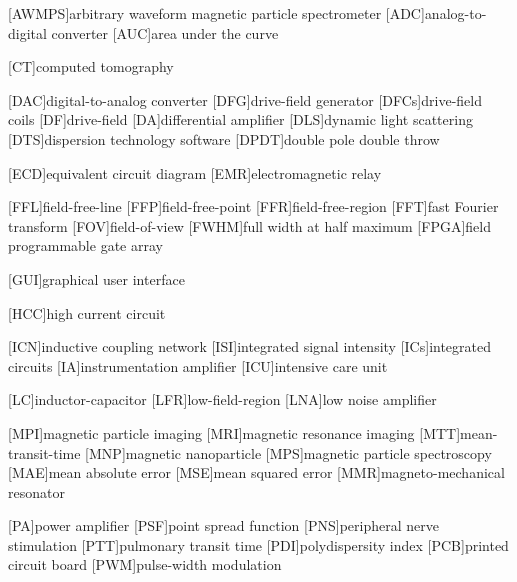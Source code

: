 \usepackage[nolist,nohyperlinks]{acronym}

% 
%
%

\begin{acronym}[ECU]

[AWMPS]{arbitrary waveform magnetic particle spectrometer}
[ADC]{analog-to-digital converter} 
[AUC]{area under the curve}

[CT]{computed tomography}

[DAC]{digital-to-analog converter}
[DFG]{drive-field generator}
[DFCs]{drive-field coils}
[DF]{drive-field}
[DA]{differential amplifier}
[DLS]{dynamic light scattering}
[DTS]{dispersion technology software}
[DPDT]{double pole double throw}

[ECD]{equivalent circuit diagram}
[EMR]{electromagnetic relay}

[FFL]{field-free-line}
[FFP]{field-free-point}
[FFR]{field-free-region}
[FFT]{fast Fourier transform}
[FOV]{field-of-view}
[FWHM]{full width at half maximum}
[FPGA]{field programmable gate array}


[GUI]{graphical user interface}

[HCC]{high current circuit}

[ICN]{inductive coupling network}
[ISI]{integrated signal intensity}
[ICs]{integrated circuits}
[IA]{instrumentation amplifier}
[ICU]{intensive care unit} 

[LC]{inductor-capacitor}
[LFR]{low-field-region}
[LNA]{low noise amplifier}

[MPI]{magnetic particle imaging}
[MRI]{magnetic resonance imaging}
[MTT]{mean-transit-time}
[MNP]{magnetic nanoparticle}
[MPS]{magnetic particle spectroscopy}
[MAE]{mean absolute error}
[MSE]{mean squared error}
[MMR]{magneto-mechanical resonator}

[PA]{power amplifier}
[PSF]{point spread function}
[PNS]{peripheral nerve stimulation}
[PTT]{pulmonary transit time}
[PDI]{polydispersity index}
[PCB]{printed circuit board}
[PWM]{pulse-width modulation}


\end{acronym}
